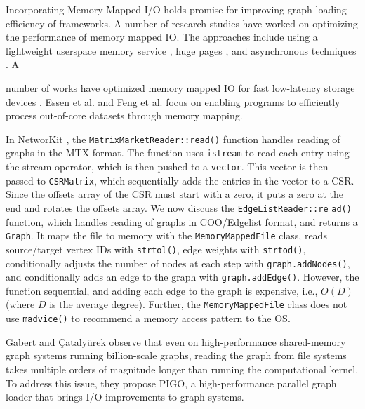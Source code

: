Incorporating Memory-Mapped I/O holds promise for improving graph loading efficiency of frameworks. A number of research studies have worked on optimizing the performance of memory mapped IO. The approaches include using a lightweight userspace memory service \cite{li2019userland}, huge pages \cite{malliotakis2021hugemap}, and asynchronous techniques \cite{imamura2019poster}. A number of works have optimized memory mapped IO for fast low-latency storage devices \cite{song2012low, song2016efficient, papagiannis2020optimizing, papagiannis2021memory, alverti2022daxvm, leis2023virtual}. Essen et al. \cite{van2015di} and Feng et al. \cite{feng2023tricache} focus on enabling programs to efficiently process out-of-core datasets through memory mapping.

In NetworKit \cite{staudt2016networkit}, the \texttt{MatrixMarketReader::read()} function handles reading of graphs in the MTX format. The function uses \texttt{istream} to read each entry using the stream operator, which is then pushed to a \texttt{vector}. This vector is then passed to \texttt{CSRMatrix}, which sequentially adds the entries in the vector to a CSR. Since the offsets array of the CSR must start with a zero, it puts a zero at the end and rotates the offsets array. We now discuss the \texttt{EdgeListReader::re} \texttt{ad()} function, which handles reading of graphs in COO/Edgelist format, and returns a \texttt{Graph}. It maps the file to memory with the \texttt{MemoryMappedFile} class, reads source/target vertex IDs with \texttt{strtol()}, edge weights with \texttt{strtod()}, conditionally adjusts the number of nodes at each step with \texttt{graph.addNodes()}, and conditionally adds an edge to the graph with \texttt{graph.addEdge()}. However, the function sequential, and adding each edge to the graph is expensive, i.e., $O(D)$ (where $D$ is the average degree). Further, the \texttt{MemoryMappedFile} class does not use \texttt{madvice()} to recommend a memory access pattern to the OS.

Gabert and Çatalyürek \cite{gabert2021pigo} observe that even on high-performance shared-memory graph systems running billion-scale graphs, reading the graph from file systems takes multiple orders of magnitude longer than running the computational kernel. To address this issue, they propose PIGO, a high-performance parallel graph loader that brings I/O improvements to graph systems.

